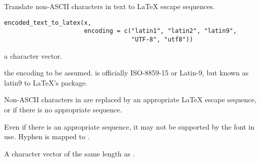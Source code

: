 %
\begin{Description}\relax
Translate non-ASCII characters in text to LaTeX escape sequences.
\end{Description}
%
\begin{Usage}
\begin{verbatim}
encoded_text_to_latex(x,
                      encoding = c("latin1", "latin2", "latin9",
                                   "UTF-8", "utf8"))
\end{verbatim}
\end{Usage}
%
\begin{Arguments}
\begin{ldescription}
\item[\code{x}] a character vector.
\item[\code{encoding}] the encoding to be assumed.   is
officially ISO-8859-15 or Latin-9, but known as latin9 to LaTeX's
 package.
\end{ldescription}
\end{Arguments}
%
\begin{Details}\relax
Non-ASCII characters in  are replaced by an appropriate LaTeX
escape sequence, or  if there is no appropriate sequence.

Even if there is an appropriate sequence, it may not be supported by
the font in use.  Hyphen is mapped to \samp{\bsl{}-}.
\end{Details}
%
\begin{Value}
A character vector of the same length as .
\end{Value}
%
\begin{SeeAlso}\relax
{}
\end{SeeAlso}
%
